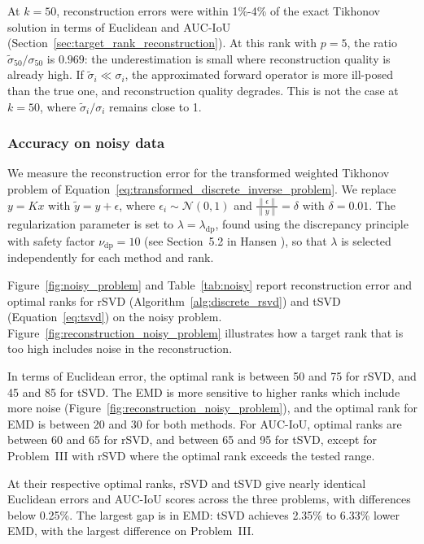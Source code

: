 At $k = 50$, reconstruction errors were within 1\%-4\% of the exact Tikhonov solution in terms of Euclidean and AUC-IoU (Section~\ref{sec:target_rank_reconstruction}). At this rank with $p = 5$, the ratio $\tilde \sigma_{50}/\sigma_{50}$ is $0.969$: the underestimation is small where reconstruction quality is already high. If $\tilde \sigma_i \ll \sigma_i$, the approximated forward operator is more ill-posed than the true one, and reconstruction quality degrades. This is not the case at $k = 50$, where $\tilde \sigma_i / \sigma_i$ remains close to 1.


\subsubsection{Accuracy on noisy data}\label{sec:accuracy_on_noisy_data}
We measure the reconstruction error for the transformed weighted Tikhonov problem of Equation~\eqref{eq:transformed_discrete_inverse_problem}. We replace $y = K x$ with $\tilde y = y + \epsilon$, where $\epsilon_i \sim \mathcal{N}(0, 1)$ and $\tfrac{\| \epsilon \|}{\| y \|} = \delta$ with $\delta = 0.01$. The regularization parameter is set to $\lambda = \lambda_{\text{dp}}$, found using the discrepancy principle with safety factor $\nu_{\text{dp}} = 10$ (see Section~5.2 in Hansen \cite{hansen2010discrete}), so that $\lambda$ is selected independently for each method and rank.




Figure~\ref{fig:noisy_problem} and Table~\ref{tab:noisy} report reconstruction error and optimal ranks for rSVD (Algorithm~\ref{alg:discrete_rsvd}) and tSVD (Equation~\eqref{eq:tsvd}) on the noisy problem. Figure~\ref{fig:reconstruction_noisy_problem} illustrates how a target rank that is too high includes noise in the reconstruction.

In terms of Euclidean error, the optimal rank is between 50 and 75 for rSVD, and 45 and 85 for tSVD. The EMD is more sensitive to higher ranks which include more noise (Figure~\ref{fig:reconstruction_noisy_problem}), and the optimal rank for EMD is between 20 and 30 for both methods. For AUC-IoU, optimal ranks are between 60 and 65 for rSVD, and between 65 and 95 for tSVD, except for Problem~III with rSVD where the optimal rank exceeds the tested range.

At their respective optimal ranks, rSVD and tSVD give nearly identical Euclidean errors and AUC-IoU scores across the three problems, with differences below 0.25\%. The largest gap is in EMD: tSVD achieves 2.35\% to 6.33\% lower EMD, with the largest difference on Problem~III.

